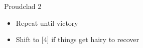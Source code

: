 \begin{battle}[2:01]{Proudclad 2}
\begin{multicols}{2}
\begin{itemize}
\begin{itemize}
\begin{itemize}
                            \begin{itemize}
                              \item Repeat until victory
                              \item Shift to [4] if things get hairy to recover
                            \end{itemize}
                    \end{itemize}
            \end{itemize}
    \end{itemize}
  \end{multicols}
\end{battle}
